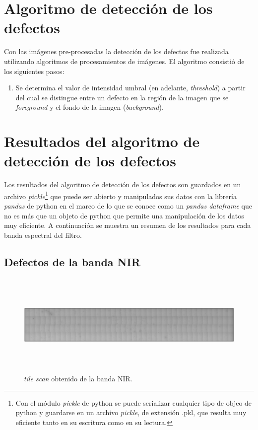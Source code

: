 \documentclass{ctuthesis}
\begin{document}
\singlespacing
\section*{Algoritmo de detección de los defectos}

\hspace{0.5cm}Con las imágenes pre-procesadas la detección de los defectos fue realizada utilizando algoritmos de procesamientos de imágenes. El algoritmo consistió de los siguientes pasos:
\begin{enumerate}
	\item Se determina el valor de intensidad umbral (en adelante, \textit{threshold}) a partir del cual se distingue entre un defecto en la región de la imagen que se \textit{foreground} y el fondo de la imagen (\textit{background}). %
\end{enumerate}





\singlespacing
\section*{Resultados del algoritmo de detección de los defectos}


\hspace{0.5cm}Los resultados del algoritmo de detección de los defectos son guardados en un archivo \textit{pickle}\footnote{Con el módulo \textit{pickle} de python se puede serializar cualquier tipo de objeo de python y guardarse en un archivo \textit{pickle}, de extensión .pkl, que resulta muy eficiente tanto en su escritura como en su lectura.} que puede ser abierto y manipulados sus datos con la librería \textit{pandas} de python en el marco de lo que se conoce como un \textit{pandas dataframe} que no es más que un objeto de python que permite una manipulación de los datos muy eficiente. A continuación se muestra un resumen de los resultados para cada banda espectral del filtro.

\singlespacing
\subsection*{Defectos de la banda NIR}


\begin{figure}[H]
	\centering
	\includegraphics[width=1.0\textwidth,height= 5.0cm]{Figs/resultados_defectos/banda_nir.png}
	\caption{\textit{tile scan} obtenido de la banda NIR.}
	\label{fig:bgcel}
\end{figure}
\end{document}
